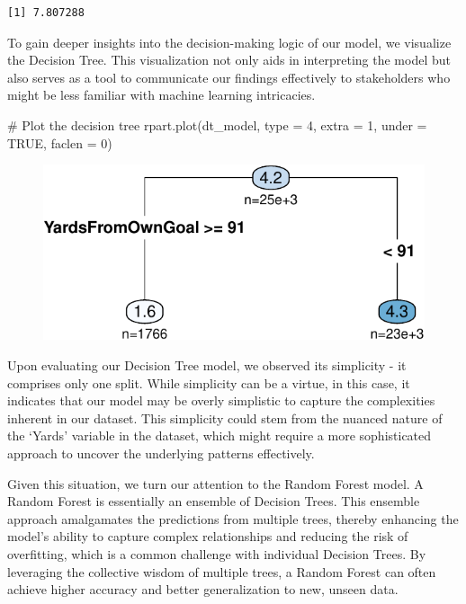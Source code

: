 \documentclass[
  super,
  preprint,
  3p]{elsarticle}
\newenvironment{Shaded}{\begin{snugshade}}{\end{snugshade}}
\newcommand{\AttributeTok}[1]{\textcolor[rgb]{0.40,0.45,0.13}{#1}}
\newcommand{\CommentTok}[1]{\textcolor[rgb]{0.37,0.37,0.37}{#1}}
\newcommand{\ConstantTok}[1]{\textcolor[rgb]{0.56,0.35,0.01}{#1}}
\newcommand{\DecValTok}[1]{\textcolor[rgb]{0.68,0.00,0.00}{#1}}
\newcommand{\FunctionTok}[1]{\textcolor[rgb]{0.28,0.35,0.67}{#1}}
\newcommand{\NormalTok}[1]{\textcolor[rgb]{0.00,0.23,0.31}{#1}}
\begin{document}
\begin{verbatim}
[1] 7.807288
\end{verbatim}

To gain deeper insights into the decision-making logic of our model, we
visualize the Decision Tree. This visualization not only aids in
interpreting the model but also serves as a tool to communicate our
findings effectively to stakeholders who might be less familiar with
machine learning intricacies.

\begin{Shaded}
\begin{Highlighting}[]
\CommentTok{\# Plot the decision tree}
\FunctionTok{rpart.plot}\NormalTok{(dt\_model, }\AttributeTok{type =} \DecValTok{4}\NormalTok{, }\AttributeTok{extra =} \DecValTok{1}\NormalTok{, }\AttributeTok{under =} \ConstantTok{TRUE}\NormalTok{, }\AttributeTok{faclen =} \DecValTok{0}\NormalTok{)}
\end{Highlighting}
\end{Shaded}

\begin{figure}[H]

{\centering \includegraphics{project_report_files/figure-pdf/unnamed-chunk-47-1.pdf}

}

\end{figure}

Upon evaluating our Decision Tree model, we observed its simplicity - it
comprises only one split. While simplicity can be a virtue, in this
case, it indicates that our model may be overly simplistic to capture
the complexities inherent in our dataset. This simplicity could stem
from the nuanced nature of the `Yards' variable in the dataset, which
might require a more sophisticated approach to uncover the underlying
patterns effectively.

Given this situation, we turn our attention to the Random Forest model.
A Random Forest is essentially an ensemble of Decision Trees. This
ensemble approach amalgamates the predictions from multiple trees,
thereby enhancing the model's ability to capture complex relationships
and reducing the risk of overfitting, which is a common challenge with
individual Decision Trees. By leveraging the collective wisdom of
multiple trees, a Random Forest can often achieve higher accuracy and
better generalization to new, unseen data.
\end{document}
